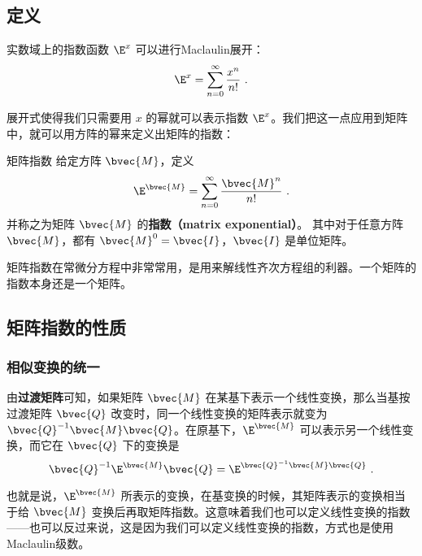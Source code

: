 
\begin{issues}
\issueMissDepend
\end{issues}


\subsection{定义}
实数域上的指数函数 $\E^x$ 可以进行Maclaulin展开：\begin{equation}
\E^x=\sum\limits_{n=0}^\infty \frac{x^n}{n!}~.
\end{equation}

展开式使得我们只需要用 $x$ 的幂就可以表示指数 $\E^x$。我们把这一点应用到矩阵中，就可以用方阵的幂来定义出矩阵的指数：

\begin{definition}{矩阵指数}
给定方阵 $\bvec{M}$，定义
\begin{equation}\label{eq_MatExp_2}
\E^{\bvec{M}}=\sum_{n=0}^\infty \frac{\bvec{M}^n}{n!}~.
\end{equation}
并称之为矩阵 $\bvec{M}$ 的\textbf{指数（matrix exponential）}。 其中对于任意方阵 $\bvec{M}$，都有 $\bvec{M}^0=\bvec{I}$，$\bvec{I}$ 是单位矩阵。
\end{definition}

矩阵指数在常微分方程中非常常用，是用来解线性齐次方程组的利器。一个矩阵的指数本身还是一个矩阵。

\subsection{矩阵指数的性质}

\subsubsection{相似变换的统一}

由\textbf{过渡矩阵}可知，如果矩阵 $\bvec{M}$ 在某基下表示一个线性变换，那么当基按过渡矩阵 $\bvec{Q}$ 改变时，同一个线性变换的矩阵表示就变为 $\bvec{Q}^{-1}\bvec{M}\bvec{Q}$。在原基下，$\E^{\bvec{M}}$ 可以表示另一个线性变换，而它在 $\bvec{Q}$ 下的变换是
\begin{equation}\label{eq_MatExp_1}
\bvec{Q}^{-1}\E^{\bvec{M}}\bvec{Q}=\E^{\bvec{Q}^{-1}\bvec{M}\bvec{Q}}~.
\end{equation}

也就是说，$\E^{\bvec{M}}$ 所表示的变换，在基变换的时候，其矩阵表示的变换相当于给 $\bvec{M}$ 变换后再取矩阵指数。这意味着我们也可以定义线性变换的指数——也可以反过来说，这是因为我们可以定义线性变换的指数，方式也是使用Maclaulin级数。

